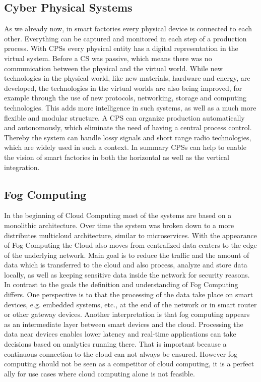 \subsection{Cyber Physical Systems}
As we already now, in smart factories every physical device is connected to each other.
Everything can be captured and monitored in each step of a production process.
With \acp{CPS} every physical entity has a digital representation in the virtual system.\autocite[cf.][p. 1363]{Poovendran:2010}
Before a \ac{CS} was passive, which means there was no communication between the physical and the virtual world.\autocite[cf.][p. 1364]{Poovendran:2010}
While new technologies in the physical world, like new materials, hardware and energy, are developed, the technologies in the virtual worlds are also being improved, for example through the use of new protocols, networking, storage and computing technologies.\autocite[cf.][p. 1364]{Poovendran:2010}
This adds more intelligence in such systems, as well as a much more flexible and modular structure.
A \ac{CPS} can organize production automatically and autonomously, which eliminate the need of having a central process control.\autocite[cf.]{Lom:2016}
Thereby the system can handle lossy signals and short range radio technologies, which are widely used in such a context.\autocite[cf.]{Yannuzzi:2014}
In summary \acp{CPS} can help to enable the vision of smart factories in both the horizontal as well as the vertical integration.


\subsection{Fog Computing}
In the beginning of Cloud Computing most of the systems are based on a monolithic architecture.
Over time the system was broken down to a more distributes multicloud architecture, similar to microservices.
With the appearance of Fog Computing the Cloud also moves from centralized data centers to the edge of the underlying network.
Main goal is to reduce the traffic and the amount of data which is transferred to the cloud and also process, analyze and store data locally, as well as keeping sensitive data inside the network for security reasons.\autocite[cf.][p. 236]{Brito:2016}\autocite[cf.][p. 325]{Yannuzzi:2014}\autocite[cf.][p. 4]{Lom:2016}
In contrast to the goals the definition and understanding of Fog Computing differs.
One perspective is to that the processing of the data take place on smart devices, e.g. embedded systems, etc., at the end of the network or in smart router or other gateway devices.\autocite[cf.][p. 4]{Lom:2016}
Another interpretation is that fog computing appears as an intermediate layer between smart devices and the cloud.\autocite[cf.][p. 236]{Brito:2016}
Processing the data near devices enables lower latency and real-time applications can take decisions based on analytics running there.
That is important because a continuous connection to the cloud can not always be ensured.
However fog computing should not be seen as a competitor of cloud computing, it is a perfect ally for use cases where cloud computing alone is not feasible.\autocite[cf.][p. 325]{Yannuzzi:2014}


